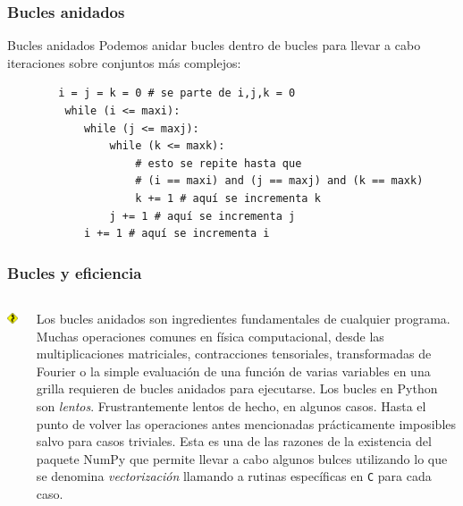 \documentclass{beamer}
\begin{document}
\begin{frame}[fragile]
    \frametitle{Bucles anidados}
    \begin{block}{Bucles anidados}
    Podemos anidar bucles dentro de bucles para llevar a cabo iteraciones sobre conjuntos más complejos:
    \begin{verbatim}
        i = j = k = 0 # se parte de i,j,k = 0
         while (i <= maxi):
            while (j <= maxj):
                while (k <= maxk):
                    # esto se repite hasta que  
                    # (i == maxi) and (j == maxj) and (k == maxk)
                    k += 1 # aquí se incrementa k
                j += 1 # aquí se incrementa j
            i += 1 # aquí se incrementa i
    \end{verbatim}
    \end{block}
\end{frame}


\begin{frame}[fragile]
    \frametitle{Bucles y eficiencia}

\begin{columns}
    \begin{column}{0.3\textwidth}
        \includegraphics[width=3cm]{figuras/sin.png}
    \end{column}
    \begin{column}{0.7\textwidth}
        Los bucles anidados son ingredientes fundamentales de cualquier programa. Muchas operaciones comunes en física computacional,
        desde las multiplicaciones matriciales, contracciones tensoriales, transformadas de Fourier o la simple evaluación de una función 
        de varias variables en una grilla requieren de bucles anidados para ejecutarse. Los bucles en Python son {\em lentos}. Frustrantemente
        lentos de hecho, en algunos casos. Hasta el punto de volver las operaciones antes mencionadas prácticamente imposibles salvo
        para casos triviales. Esta es una de las razones de la existencia del paquete NumPy que permite llevar a cabo \alert{algunos}
        bulces utilizando lo que se denomina {\em vectorización} llamando a rutinas específicas en {\tt C} para cada caso.
    \end{column}

\end{columns}
 \end{frame}
\end{document}
